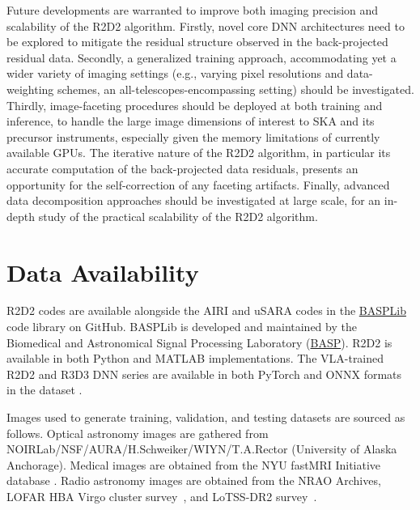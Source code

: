 \documentclass[preprint2,twocolumn]{aastex631}
\begin{document}
{Future developments are warranted to improve both imaging precision and scalability of the R2D2 algorithm. Firstly, novel core DNN architectures need to be explored to mitigate the residual structure observed in the back-projected residual data. Secondly, a generalized training approach, accommodating yet a wider variety of imaging settings (e.g., varying pixel resolutions and data-weighting schemes, an all-telescopes-encompassing setting) should be investigated. {Thirdly, image-faceting procedures \citep[e.g.,][]{thouvenin2023a} should be deployed at both training and inference, to handle the large image dimensions of interest to SKA and its precursor instruments, especially given the memory limitations of currently available GPUs. The iterative nature of the R2D2 algorithm, in particular its accurate computation of the back-projected data residuals, presents an opportunity for the self-correction of any faceting artifacts.} Finally, advanced data decomposition approaches should be investigated at large scale, for an in-depth study of the practical scalability of the R2D2 algorithm. 

\section*{Data Availability}
R2D2 codes are available alongside the AIRI and uSARA codes in the \href{https://basp-group.github.io/BASPLib/}{BASPLib} code library on GitHub. BASPLib is developed and maintained by the Biomedical and Astronomical Signal Processing Laboratory (\href{https://basp.site.hw.ac.uk/}{BASP}). R2D2 is available in both Python and MATLAB implementations. The VLA-trained R2D2 and R3D3 DNN series are available in both PyTorch and ONNX formats in the dataset \citet{r2d2dnns}.

Images used to generate training, validation, and testing datasets are sourced as follows. Optical astronomy images are gathered from NOIRLab/NSF/AURA/H.Schweiker/WIYN/T.A.Rector (University of Alaska Anchorage). Medical images are obtained from the NYU fastMRI Initiative database \citep{zbontar2018fastmri,knoll2020fastmri}. Radio astronomy images are obtained from the NRAO Archives, LOFAR HBA Virgo cluster survey~\citep{edler2023}, and LoTSS-DR2 survey~\citep{shimwell2022}.


\vspace{4mm}

}
\end{document}
